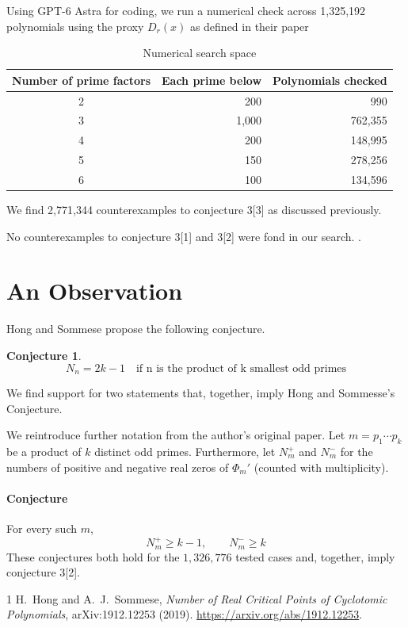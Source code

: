 \documentclass[11pt,letterpaper]{article}
\theoremstyle{plain}
\newtheorem{conjecture}[theorem]{Conjecture}
\theoremstyle{definition}
\theoremstyle{remark}
\begin{document}
Using GPT-6 Astra for coding, we run a numerical check across 1,325,192 polynomials using the proxy $D_r (x)$ as defined in their paper

\begin{table}[htbp]
\centering
\begin{tabular}{@{}crr@{}}
\toprule
Number of prime factors & Each prime below & Polynomials checked \\
\midrule
2 & 200   & 990     \\
3 & 1,000 & 762,355 \\
4 & 200   & 148,995 \\
5 & 150   & 278,256 \\
6 & 100   & 134,596 \\
\bottomrule
\end{tabular}
\caption{Numerical search space}
\label{tab:search-domains}
\end{table}

We find 2,771,344 counterexamples to conjecture 3[3] as discussed previously.

No counterexamples to conjecture 3[1] and 3[2] were fond in our search. 
.
\section{An Observation}
Hong and Sommese propose the following conjecture.
\setcounter{theorem}{2}

\begin{conjecture}
\[
N_n=2k-1
\quad\text{if n is the product of k smallest odd primes}
\]
\end{conjecture}

We find support for two statements that, together, imply Hong and Sommesse's
Conjecture.

 We reintroduce further notation from the author's original paper. Let
\(m=p_1\cdots p_k\) be a product of \(k\) distinct odd primes.
Furthermore, let \(N_m^+\) and \(N_m^-\) for the numbers of positive and
negative real zeros of \(\Phi_m'\) (counted with multiplicity).

\paragraph{Conjecture}
For every such \(m\),
\[
N_m^+\ge k-1,
\qquad
N_m^-\ge k
\]
These conjectures both hold for the \(1{,}326{,}776\) tested cases and, together, imply conjecture 3[2].

\begingroup
\small
\begin{thebibliography}{1}
H.~Hong and A.~J.~Sommese,
\emph{Number of Real Critical Points of Cyclotomic Polynomials},
arXiv:1912.12253 (2019).
\url{https://arxiv.org/abs/1912.12253}.
\end{thebibliography}
\endgroup
\end{document}
